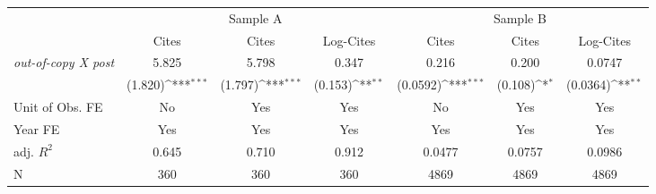 {
\def\sym#1{\ifmmode^{#1}\else\(^{#1}\)\fi}
\begin{tabular*}{\hsize}{@{\hskip\tabcolsep\extracolsep\fill}l*{6}{c}}
\toprule
            &\multicolumn{3}{c}{Sample A}                                     &\multicolumn{3}{c}{Sample B}                                     \\\cmidrule(lr){2-4}\cmidrule(lr){5-7}
            &\multicolumn{1}{c}{Cites}&\multicolumn{1}{c}{Cites}&\multicolumn{1}{c}{Log-Cites}&\multicolumn{1}{c}{Cites}&\multicolumn{1}{c}{Cites}&\multicolumn{1}{c}{Log-Cites}\\
\midrule
\emph{out-of-copy X post}&       5.825         &       5.798         &       0.347         &       0.216         &       0.200         &      0.0747         \\
            &     (1.820)\sym{***}&     (1.797)\sym{***}&     (0.153)\sym{**} &    (0.0592)\sym{***}&     (0.108)\sym{*}  &    (0.0364)\sym{**} \\
\midrule
Unit of Obs. FE&          No         &         Yes         &         Yes         &          No         &         Yes         &         Yes         \\
Year FE     &         Yes         &         Yes         &         Yes         &         Yes         &         Yes         &         Yes         \\
adj. $R^2$  &       0.645         &       0.710         &       0.912         &      0.0477         &      0.0757         &      0.0986         \\
N           &         360         &         360         &         360         &        4869         &        4869         &        4869         \\
\bottomrule
\end{tabular*}
}
